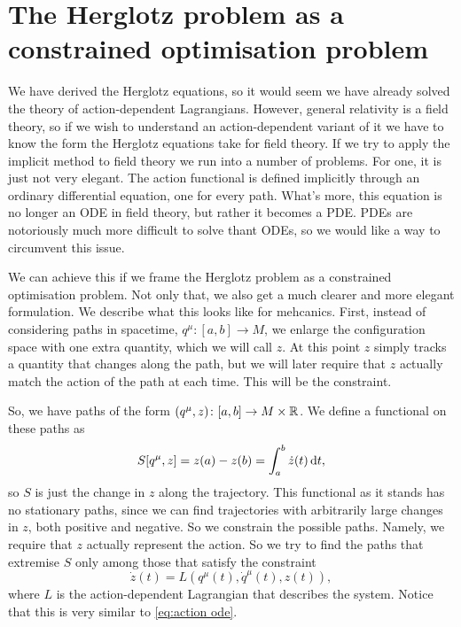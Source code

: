 \documentclass[../main.tex]{subfiles}
\begin{document}
\section{The Herglotz problem as a constrained optimisation problem}
We have derived the Herglotz equations, so it would seem we have already solved the theory
of action-dependent Lagrangians. However, general relativity is a field theory, so if we
wish to understand an action-dependent variant of it we have to know the form the Herglotz
equations take for field theory. If we try to apply the implicit method to field theory we
run into a number of problems. For one, it is just not very elegant. The action functional
is defined implicitly through an ordinary differential equation, one for every path.
What's more, this equation is no longer an ODE in field theory, but rather it becomes a
PDE. PDEs are notoriously much more difficult to solve thant ODEs, so we would like a way
to circumvent this issue. 

We can achieve this if we frame the Herglotz problem as a constrained optimisation
problem. Not only that, we also get a much clearer and more elegant formulation. We
describe what this looks like for mehcanics. First, instead of considering paths in
spacetime, \( q^\mu \colon [a,b] \to M \), we enlarge the configuration space with one
extra quantity, which we will call \( z \). At this point \( z \) simply tracks a quantity
that changes along the path, but we will later require that \( z \) actually match the
action of the path at each time. This will be the constraint. 

So, we have paths of the form \( (q^\mu, z) \colon [a,b] \to M \times \mathbb{R} \). We define a
functional on these paths as
\begin{equation}\label{eq:action functional unconstrained}
	S[q^\mu, z] = z(a) - z(b) = \int_a^b \dot{z}(t) \,\mathrm{d} t,
\end{equation}
so \( S \) is just the change in \( z \) along the trajectory. This functional as it
stands has no stationary paths, since we can find trajectories with arbitrarily large
changes in \( z \), both positive and negative. So we constrain the possible paths.
Namely, we require that \( z \) actually represent the action. So we try to find the paths
that extremise \( S \) only among those that satisfy the constraint
\begin{equation}\label{eq:constraint mechanics}
	\dot{z}(t) = L(q^\mu(t), \dot{q}^\mu(t), z(t)),
\end{equation}
where \( L \) is the action-dependent Lagrangian that describes the system.  Notice that
this is very similar to \cref{eq:action ode}. 
\end{document}
